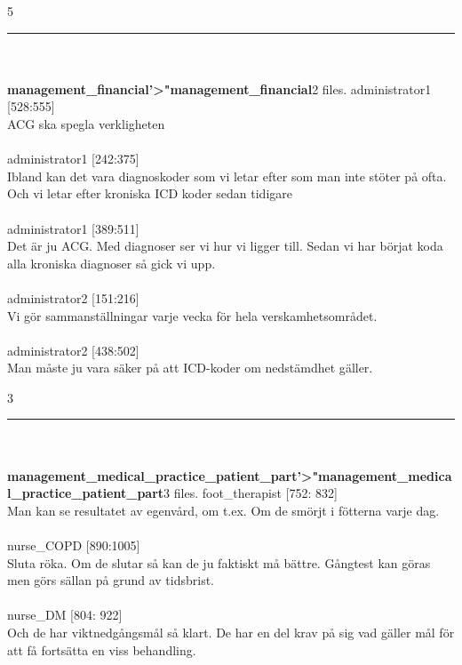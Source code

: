 \documentclass[12pt,a4paper,oneside]{article}
\begin{document}
5 
\hrule
\ \\\ \\{\bf management\_financial'>"management\_financial}2 files.
 administrator1 [528:555]\\ 
ACG ska spegla verkligheten %
\ \\\ \\
 administrator1 [242:375]\\ 
Ibland kan det vara diagnoskoder som vi letar efter som man inte st{\"o}ter p{\aa} ofta. Och vi letar efter kroniska ICD koder sedan tidigare %
\ \\\ \\
 administrator1 [389:511]\\ 
Det {\"a}r ju ACG. Med diagnoser ser vi hur vi ligger till. Sedan vi har b{\"o}rjat  koda alla kroniska diagnoser s{\aa} gick vi upp.  %
\ \\\ \\
 administrator2 [151:216]\\ 
Vi g{\"o}r sammanst{\"a}llningar varje vecka f{\"o}r hela verskamhetsomr{\aa}det. %
\ \\\ \\
 administrator2 [438:502]\\ 
Man m{\aa}ste ju vara s{\"a}ker p{\aa} att ICD-koder om nedst{\"a}mdhet g{\"a}ller.  %

3 
\hrule
\ \\\ \\{\bf management\_medical\_practice\_patient\_part'>"management\_medical\_practice\_patient\_part}3 files.
 foot\_therapist [752: 832]\\ 
Man kan se  resultatet av egenv{\aa}rd,  om t.ex. Om de sm{\"o}rjt i f{\"o}tterna varje dag. %
\ \\\ \\
 nurse\_COPD [890:1005]\\ 
Sluta r{\"o}ka. Om de slutar s{\aa} kan de ju faktiskt m{\aa} b{\"a}ttre. G{\aa}ngtest kan g{\"o}ras men g{\"o}rs s{\"a}llan p{\aa} grund av tidsbrist. %
\ \\\ \\
 nurse\_DM [804: 922]\\ 
Och de har viktnedg{\aa}ngsm{\aa}l s{\aa} klart. De har en del krav p{\aa} sig vad g{\"a}ller m{\aa}l f{\"o}r att f{\aa} forts{\"a}tta en viss behandling. %
\end{document}
